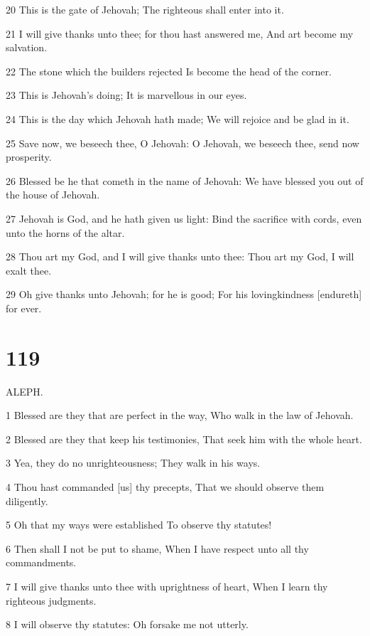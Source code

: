 \par 20 This is the gate of Jehovah; The righteous shall enter into it.
\par 21 I will give thanks unto thee; for thou hast answered me, And art become my salvation.
\par 22 The stone which the builders rejected Is become the head of the corner.
\par 23 This is Jehovah's doing; It is marvellous in our eyes.
\par 24 This is the day which Jehovah hath made; We will rejoice and be glad in it.
\par 25 Save now, we beseech thee, O Jehovah: O Jehovah, we beseech thee, send now prosperity.
\par 26 Blessed be he that cometh in the name of Jehovah: We have blessed you out of the house of Jehovah.
\par 27 Jehovah is God, and he hath given us light: Bind the sacrifice with cords, even unto the horns of the altar.
\par 28 Thou art my God, and I will give thanks unto thee: Thou art my God, I will exalt thee.
\par 29 Oh give thanks unto Jehovah; for he is good; For his lovingkindness [endureth] for ever.

\chapter{119}

\par ALEPH.

\par 1 Blessed are they that are perfect in the way, Who walk in the law of Jehovah.
\par 2 Blessed are they that keep his testimonies, That seek him with the whole heart.
\par 3 Yea, they do no unrighteousness; They walk in his ways.
\par 4 Thou hast commanded [us] thy precepts, That we should observe them diligently.
\par 5 Oh that my ways were established To observe thy statutes!
\par 6 Then shall I not be put to shame, When I have respect unto all thy commandments.
\par 7 I will give thanks unto thee with uprightness of heart, When I learn thy righteous judgments.
\par 8 I will observe thy statutes: Oh forsake me not utterly.

